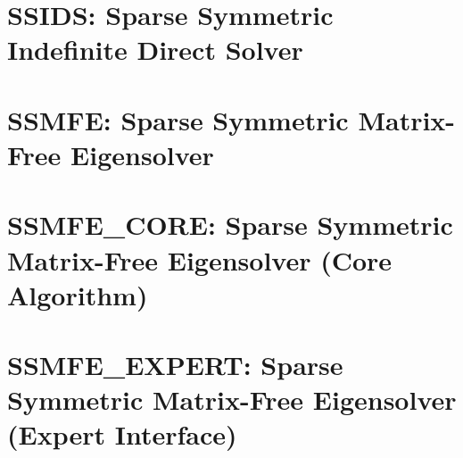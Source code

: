 \documentclass{spralweb}
\begin{document}
\chapter{SSIDS: Sparse Symmetric Indefinite Direct Solver}

\chapter{SSMFE: Sparse Symmetric Matrix-Free Eigensolver}

\chapter{SSMFE\_CORE: Sparse Symmetric Matrix-Free Eigensolver (Core Algorithm)}

\chapter{SSMFE\_EXPERT: Sparse Symmetric Matrix-Free Eigensolver (Expert Interface)}

\end{document}
